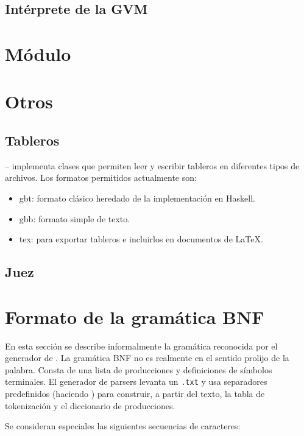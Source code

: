\documentclass{article}
\begin{document}
\subsection{Int\'erprete de la GVM}


\section{M\'odulo }

\section{Otros}

\subsection{Tableros}

 -- implementa clases que
permiten leer y escribir tableros en diferentes tipos de
archivos. Los formatos permitidos actualmente son:
\begin{itemize}
\item \textsf{gbt}: formato cl\'asico heredado de la implementaci\'on en Haskell.
\item \textsf{gbb}: formato simple de texto.
\item \textsf{tex}: para exportar tableros e incluirlos en documentos de \LaTeX.
\end{itemize}

\subsection{Juez}

\appendix
\newpage
\section{Formato de la gram\'atica BNF}

En esta secci\'on se describe informalmente la gram\'atica
reconocida por el generador de .
La gram\'atica BNF no es realmente  en el sentido
prolijo de la palabra. Consta de una lista de producciones y
definiciones de s\'imbolos terminales. El generador de parsers
levanta un \texttt{.txt} y usa separadores predefinidos
(haciendo ) para construir, a partir del texto, la
tabla de tokenizaci\'on y el diccionario de producciones.

Se consideran especiales las siguientes secuencias de caracteres:
\end{document}

